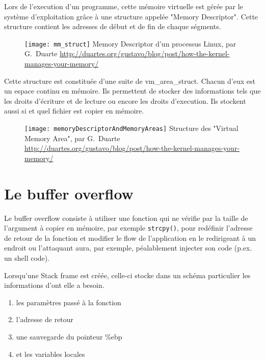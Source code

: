 Lors de l'execution d'un programme, cette mémoire virtuelle est gérée par le système d'exploitation grâce à une structure appelée "Memory Descriptor". Cette structure contient les adresses de début et de fin de chaque ségments.

\begin{figure}[H]
	\centering
	\texttt{[image: mm\_struct]}
	{Memory Descriptor d'un processus Linux, par G.~Duarte}
	{\url{http://duartes.org/gustavo/blog/post/how-the-kernel-manages-your-memory/}}
	\label{fig:mm_struct}
\end{figure}

Cette structure est constituée d'une suite de vm\_area\_struct. Chacun d'eux est un espace continu en mémoire. Ils permettent de stocker des informations tels que les droits d'écriture et de lecture ou encore les droits d'execution. Ils stockent aussi si et quel fichier est copier en mémoire.

\begin{figure}[H]
	\centering
	\texttt{[image: memoryDescriptorAndMemoryAreas]}
	{Structure des "Virtual Memory Area", par G.~Duarte}
	{\url{http://duartes.org/gustavo/blog/post/how-the-kernel-manages-your-memory/}}
	\label{fig:memoryDescriptorAndMemoryAreas}
\end{figure}

\section{Le buffer overflow}

Le buffer overflow consiste à utiliser une fonction qui ne vérifie par la taille de l'argument à copier en mémoire, par exemple \texttt{strcpy()}, pour redéfinir l'adresse de retour de la fonction et modifier le flow de l'application en le redirigeant à un endroit ou l'attaquant aura, par exemple, péalablement injecter son code (p.ex. un shell code).

Lorsqu'une Stack frame est créée, celle-ci stocke dans un schéma particulier les informations d'ont elle a besoin.

\begin{enumerate}
	\item les paramètres passé à la fonction
	\item l'adresse de retour
	\item une sauvegarde du pointeur \%ebp
	\item et les variables locales
\end{enumerate}

